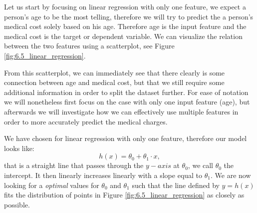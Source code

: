 \documentclass[10pt]{extarticle}
\newcommand{\<}{\langle}
\renewcommand{\>}{\rangle}
\theoremstyle{mystyle}{\newtheorem*{remark}{Remark}}
\theoremstyle{mystyle}{\newtheorem*{remarks}{Remarks}}
\theoremstyle{mystyle}{\newtheorem*{example}{Example}}
\theoremstyle{mystyle}{\newtheorem*{examples}{Examples}}
\theoremstyle{definition}{\newtheorem*{exercise}{Exercise}}
\theoremstyle{warn}
\begin{document}
Let us start by focusing on linear regression with only one feature, we expect a person's age to be the most telling, therefore we will try to predict the a person's medical cost solely based on his age. Therefore age is the input feature and the medical cost is the target or dependent variable. We can visualize the relation between the two features using a scatterplot, see Figure \ref{fig:6.5_linear_regression}.
\begin{remark}
From this scatterplot, we can immediately see that there clearly is some connection between age and medical cost, but that we still require some additional information in order to split the dataset further. For ease of notation we will nonetheless first focus on the case with only one input feature (age), but afterwards we will investigate how we can effectively use multiple features in order to more accurately predict the medical charges.
\end{remark}
We have chosen for linear regression with only one feature, therefore our model looks like:
\begin{equation}\label{eq:linreg_1feature}
h(x) = \theta_0 + \theta_1 \cdot x,
\end{equation}
that is a straight line that passes through the $y-axis$ at $\theta_0$, we call $\theta_0$ the intercept. It then linearly increases linearly with a slope equal to $\theta_1$. We are now looking for a \textit{optimal} values for $\theta_0$ and $\theta_1$ such that the line defined by $y=h(x)$ fits the distribution of points in Figure \ref{fig:6.5_linear_regression} as closely as possible.
\end{document}
